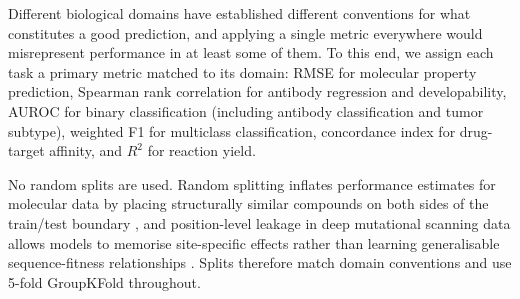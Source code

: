 Different biological domains have established different conventions for what constitutes a good prediction, and applying a single metric everywhere would misrepresent performance in at least some of them. To this end, we assign each task a primary metric matched to its domain: RMSE for molecular property prediction, Spearman rank correlation for antibody regression and developability, AUROC for binary classification (including antibody classification and tumor subtype), weighted F1 for multiclass classification, concordance index for drug-target affinity, and $R^2$ for reaction yield.

No random splits are used. Random splitting inflates performance estimates for molecular data by placing structurally similar compounds on both sides of the train/test boundary \citep{Yang2019, Wallach2018}, and position-level leakage in deep mutational scanning data allows models to memorise site-specific effects rather than learning generalisable sequence-fitness relationships \citep{Notin2023, Vieira2026}. Splits therefore match domain conventions and use 5-fold GroupKFold throughout.

